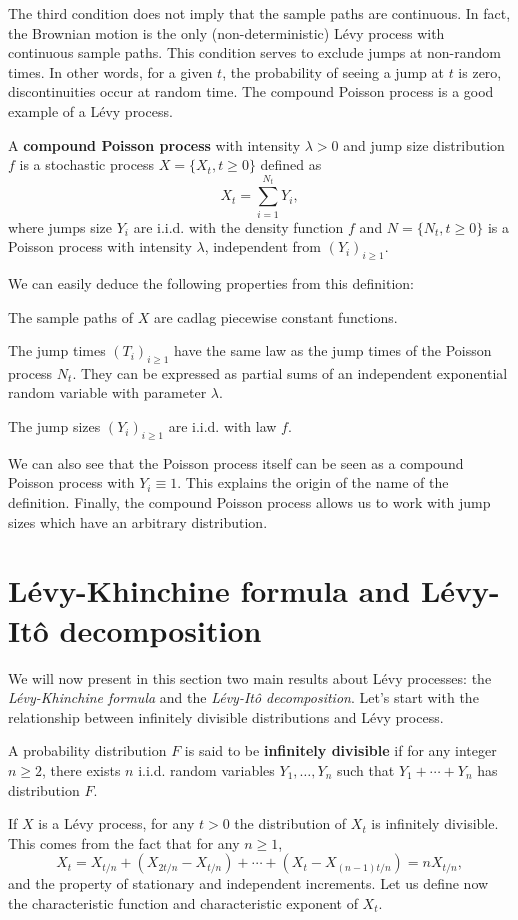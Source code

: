 The third condition does not imply that the sample paths are continuous. In fact, the Brownian motion is the only (non-deterministic) L\'evy process with continuous sample paths. This condition serves to exclude jumps at non-random times. In other words, for a given $t$, the probability of seeing a jump at $t$ is zero, discontinuities occur at random time. The compound Poisson process is a good example of a L\'evy process.

\begin{defn}
A \textbf{compound Poisson process} with intensity $\lambda > 0$ and jump size distribution $f$ is a stochastic process $X=\{X_t,t\geq 0\}$ defined as 
$$X_t = \sum_{i=1}^{N_t}Y_i,$$
where jumps size $Y_i$ are i.i.d. with the density function $f$ and $N=\{N_t,t\geq 0\}$ is a Poisson process with intensity $\lambda$, independent from $(Y_i)_{i\geq 1}$.
\end{defn}
We can easily deduce the following properties from this definition:
\begin{my_list_num}
\item The sample paths of $X$ are cadlag piecewise constant functions.
\item The jump times $(T_i)_{i\geq 1}$ have the same law as the jump times of the Poisson process $N_t$. They can be expressed as partial sums of an independent exponential random variable with parameter $\lambda$.
\item The jump sizes $(Y_i)_{i\geq1}$ are i.i.d. with law $f$.
\end{my_list_num}
We can also see that the Poisson process itself can be seen as a compound Poisson process with $Y_i \equiv 1$. This explains the origin of the name of the definition. Finally, the compound Poisson process allows us to work with jump sizes which have an arbitrary distribution.

\section{L\'evy-Khinchine formula and L\'evy-Itô decomposition}
\label{sec:Levy:theorems}
We will now present in this section two main results about L\'evy processes: the \textit{L\'evy-Khinchine formula} and the \textit{L\'evy-Itô decomposition}. Let's start with the relationship between infinitely divisible distributions and L\'evy process.

\begin{defn}
A probability distribution $F$ is said to be \textbf{infinitely divisible} if for any integer $n\geq 2$, there exists $n$ i.i.d. random variables $Y_1,\ldots,Y_n$ such that $Y_1+\cdots+Y_n$ has distribution $F$.
\end{defn}
If $X$ is a L\'evy process, for any $t>0$ the distribution of $X_t$ is infinitely divisible. This comes from the fact that for any $n \geq 1$,
\begin{equation}\label{eq:inf-div}
X_t = X_{t/n} + (X_{2t/n}-X_{t/n}) + \cdots + (X_t - X_{(n-1)t/n})=nX_{t/n},
\end{equation}
and the property of stationary and independent increments. Let us define now the characteristic function and characteristic  exponent of $X_t$.

